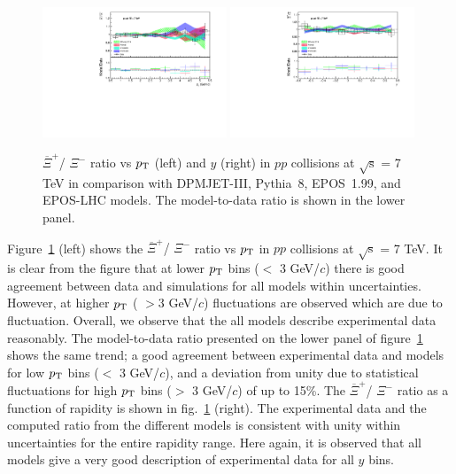 \documentclass{article}
\newcommand{\sqrts}{\mbox{$\sqrt{\mathrm{s}}$}}
\newcommand{\axi}{$\overline{\Xi}^+$}
\newcommand{\xim}{$\Xi^-$}
\newcommand{\ppt}{$p_{\rm T}$}
\begin{document}
\begin{figure}[!ht]
\centering
\includegraphics[width=0.49\textwidth,height=0.35\textheight]{zai_pt_7000.pdf}
\includegraphics[width=0.49\textwidth,height=0.35\textheight]{zai_eta_7000.pdf}

\caption{{\axi / \xim} ratio vs {\ppt} (left) and $y$ (right) in $pp$ collisions at {\sqrts} = 7 TeV in comparison with DPMJET-III, Pythia~8, EPOS~1.99, and EPOS-LHC models. The model-to-data ratio is shown in the lower panel. }
\label{fig6}
\end{figure}

Figure~\ref{fig6} (left) shows the {\axi / \xim} ratio vs {\ppt} in $pp$ collisions at {\sqrts} = 7 TeV. It is clear from the figure that at lower {\ppt} bins ($<$ 3 GeV/$c$) there is good agreement between data and simulations for all models within uncertainties. However, at higher {\ppt} ( $> 3$ GeV/$c$) fluctuations are observed which are due to fluctuation. Overall, we observe that the all models describe experimental data reasonably. 
The model-to-data ratio presented on the lower panel of figure~\ref{fig6} shows the same trend; a good agreement between experimental data and models for low {\ppt} bins ($<$ 3 GeV/$c$), and a deviation from unity due to statistical fluctuations for high {\ppt} bins ($>$ 3 GeV/$c$) of up to 15\%. The {\axi / \xim} ratio as a function of rapidity is shown in fig.~\ref{fig6} (right). The experimental data and the computed ratio from the different models is consistent with unity within uncertainties for the entire rapidity range. Here again, it is observed that all models give a very good description of experimental data for all $y$ bins. 
\end{document}
